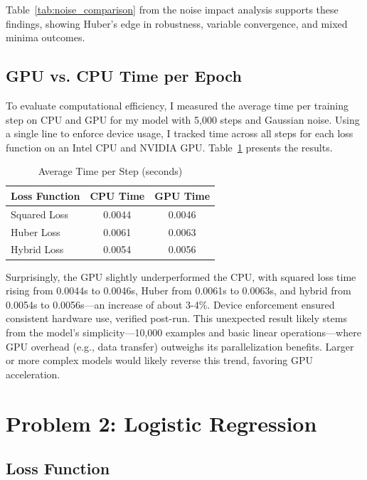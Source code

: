 \documentclass{article}
\begin{document}
Table~\ref{tab:noise_comparison} from the noise impact analysis supports these findings, showing Huber’s edge in robustness, variable convergence, and mixed minima outcomes.

\subsection{GPU vs. CPU Time per Epoch}

To evaluate computational efficiency, I measured the average time per training step on CPU and GPU for my model with 5,000 steps and Gaussian noise. Using a single line to enforce device usage, I tracked time across all steps for each loss function on an Intel CPU and NVIDIA GPU. Table~\ref{tab:time_comparison} presents the results.

\begin{table}[H]
    \centering
    \caption{Average Time per Step (seconds)}
    \label{tab:time_comparison}
    \begin{tabular}{lcc}
        \toprule
        \textbf{Loss Function} & \textbf{CPU Time} & \textbf{GPU Time} \\
        \midrule
        Squared Loss & 0.0044 & 0.0046 \\
        Huber Loss   & 0.0061 & 0.0063 \\
        Hybrid Loss  & 0.0054 & 0.0056 \\
        \bottomrule
    \end{tabular}
\end{table}

Surprisingly, the GPU slightly underperformed the CPU, with squared loss time rising from 0.0044s to 0.0046s, Huber from 0.0061s to 0.0063s, and hybrid from 0.0054s to 0.0056s—an increase of about 3-4\%. Device enforcement ensured consistent hardware use, verified post-run. This unexpected result likely stems from the model’s simplicity—10,000 examples and basic linear operations—where GPU overhead (e.g., data transfer) outweighs its parallelization benefits. Larger or more complex models would likely reverse this trend, favoring GPU acceleration.

\section{Problem 2: Logistic Regression}
\subsection{Loss Function}
\end{document}
